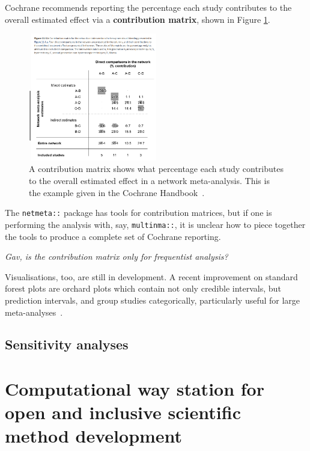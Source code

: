 \documentclass[12pt]{article}\usepackage[]{graphicx}\usepackage[]{color}
\newcommand{\package}[1]{\texttt{{#1::}}}
\begin{document}

Cochrane recommends reporting the percentage each study contributes to the overall estimated effect via a \textbf{contribution matrix}, shown in Figure \ref{fig:cmatrix}.

\begin{figure}
\centering
\includegraphics[width=0.5\textwidth]{contribution-matrix}
\caption{A contribution matrix shows what percentage each study contributes to the overall estimated effect in a network meta-analysis. This is the example given in the Cochrane Handbook~\cite{higgins2019cochrane}.}
\label{fig:cmatrix}
\end{figure}

The \package{netmeta} package has tools for contribution matrices, but if one is performing the analysis with, say, \package{multinma}, it is unclear how to piece together the tools to produce a complete set of Cochrane reporting.

\emph{Gav, is the contribution matrix only for frequentist analysis?}

Visualisations, too, are still in development. A recent improvement on standard forest plots are orchard plots which contain not only credible intervals, but prediction intervals, and group studies categorically, particularly useful for large meta-analyses~\cite{nakagawa_orchard_2021}.

\subsection{Sensitivity analyses}





\section{Computational way station for open and inclusive scientific method development}\label{sec:comp}
\end{document}
